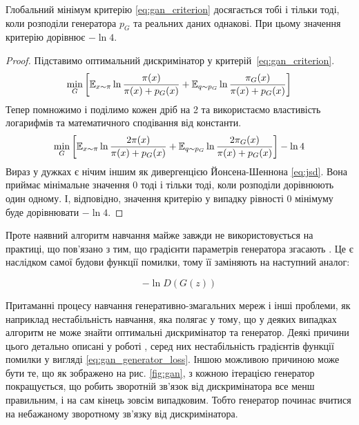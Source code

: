 \begin{theorem}
    Глобальний мінімум критерію \eqref{eq:gan_criterion} досягається
    тобі і тільки тоді, коли розподіли генератора $p_G$ та реальних даних
    однакові. При цьому значення критерію дорівнює $-\ln 4$.
\end{theorem}
\begin{proof}
    Підставимо оптимальний дискримінатор у критерій~\eqref{eq:gan_criterion}.
    \begin{equation*}
        \min\limits_{G} \left[
            \operatorname{\mathbb{E}}_{x \sim \pi} \ln \frac{\pi(x)}{\pi(x) + p_G(x)} +
            \operatorname{\mathbb{E}}_{q \sim p_G} \ln \frac{\pi_G(x)}{\pi(x) + p_G(x)}
            \right]
    \end{equation*}
    Тепер помножимо і поділимо кожен дріб на 2 та використаємо властивість
    логарифмів та математичного сподівання від константи.
    \begin{equation*}
        \min\limits_{G} \left[
            \operatorname{\mathbb{E}}_{x \sim \pi} \ln \frac{2 \pi(x)}{\pi(x) + p_G(x)} +
            \operatorname{\mathbb{E}}_{q \sim p_G} \ln \frac{2 \pi_G(x)}{\pi(x) + p_G(x)}
            \right] - \ln 4
    \end{equation*}
    Вираз у дужках є нічим іншим як дивергенцією Йонсена-Шеннона \eqref{eq:jsd}.
    Вона приймає мінімальне значення $0$ тоді і тільки тоді, коли
    розподіли дорівнюють один одному. І, відповідно, значення критерію
    у випадку рівності $0$ мінімуму буде дорівнювати $-\ln 4$.
\end{proof}

Проте наявний алгоритм навчання майже завжди не використовується
на практиці, що пов'язано з тим, що градієнти параметрів генератора
згасають \cite{arjovsky2017towards, goodfellow2014generative}.
Це є наслідком самої будови функції помилки, тому її заміняють
на наступний аналог:

\begin{equation} \label{eq:gan_generator_loss}
    - \ln D(G(z))
\end{equation}

Притаманні процесу навчання генеративно-змагальних мереж і інші проблеми,
як наприклад нестабільність навчання, яка полягає у тому, що
у деяких випадках алгоритм не може знайти оптимальні
дискримінатор та генератор. Деякі причини цього детально
описані у роботі \cite{arjovsky2017towards}, серед них нестабільність
градієнтів функції помилки у вигляді \eqref{eq:gan_generator_loss}.
Іншою можливою причиною може бути те, що як зображено на рис. \ref{fig:gan},
з кожною ітерацією генератор покращується, що робить зворотній
зв'язок від дискримінатора все менш правильним, і на сам кінець зовсім випадковим.
Тобто генератор починає вчитися на небажаному зворотному зв'язку від дискримінатора.

